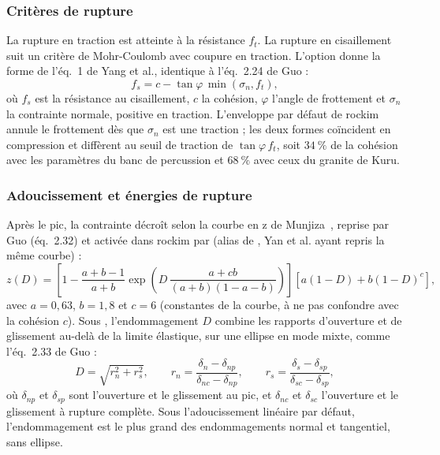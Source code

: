 \subsubsection{Critères de rupture}

La rupture en traction est atteinte à la résistance $f_t$. La rupture en cisaillement suit un critère de Mohr-Coulomb avec coupure en traction. L'option  donne la forme de l'éq.~1 de Yang et al., identique à l'éq.~{2.24} de Guo :
\begin{equation}
f_s = c - \tan\varphi \, \min(\sigma_n, f_t) ,
\label{eq-mc}
\end{equation}
où $f_s$ est la résistance au cisaillement, $c$ la cohésion, $\varphi$ l'angle de frottement et $\sigma_n$ la contrainte normale, positive en traction. L'enveloppe par défaut de rockim annule le frottement dès que $\sigma_n$ est une traction ; les deux formes coïncident en compression et diffèrent au seuil de traction de $\tan\varphi\,f_t$, soit $34~\%$ de la cohésion avec les paramètres du banc de percussion et $68~\%$ avec ceux du granite de Kuru.

\subsubsection{Adoucissement et énergies de rupture}

Après le pic, la contrainte décroît selon la courbe en z de Munjiza~\cite{munjiza1999smeared}, reprise par Guo (éq.~{2.32}) et activée dans rockim par  (alias de , Yan et al. ayant repris la même courbe) :
\begin{equation}
z(D) = \left[1 - \frac{a+b-1}{a+b} \exp\!\left(D\,\frac{a+cb}{(a+b)(1-a-b)}\right)\right]\left[a(1-D) + b(1-D)^c\right],
\label{eq-z}
\end{equation}
avec $a = 0{,}63$, $b = 1{,}8$ et $c = 6$ (constantes de la courbe, à ne pas confondre avec la cohésion $c$). Sous , l'endommagement $D$ combine les rapports d'ouverture et de glissement au-delà de la limite élastique, sur une ellipse en mode mixte, comme l'éq.~{2.33} de Guo :
\begin{equation}
D = \sqrt{r_n^2 + r_s^2}, \qquad r_n = \frac{\delta_n - \delta_{np}}{\delta_{nc} - \delta_{np}}, \qquad r_s = \frac{\delta_s - \delta_{sp}}{\delta_{sc} - \delta_{sp}} ,
\label{eq-D}
\end{equation}
où $\delta_{np}$ et $\delta_{sp}$ sont l'ouverture et le glissement au pic, et $\delta_{nc}$ et $\delta_{sc}$ l'ouverture et le glissement à rupture complète. Sous l'adoucissement linéaire par défaut, l'endommagement est le plus grand des endommagements normal et tangentiel, sans ellipse.

